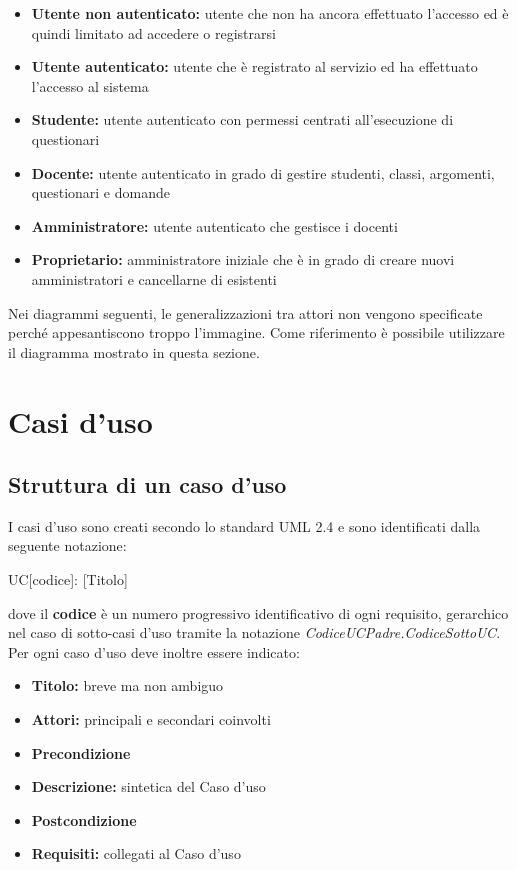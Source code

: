\documentclass[12pt,a4paper]{article}
\begin{document}
\begin{itemize}
    \item \textbf{Utente non autenticato:} utente che non ha ancora effettuato l'accesso ed è quindi limitato
        ad accedere o registrarsi
    \item \textbf{Utente autenticato:} utente che è registrato al servizio ed ha effettuato l'accesso al
        sistema
    \item \textbf{Studente:} utente autenticato con permessi centrati all'esecuzione di
        questionari
    \item \textbf{Docente:} utente autenticato in grado di gestire studenti, classi, argomenti, questionari
        e domande
    \item \textbf{Amministratore:} utente autenticato che gestisce i docenti
    \item \textbf{Proprietario:} amministratore iniziale che è in grado di creare nuovi amministratori
        e cancellarne di esistenti
\end{itemize}

Nei diagrammi seguenti, le generalizzazioni tra attori non vengono specificate perché
appesantiscono troppo l'immagine. Come riferimento è possibile utilizzare il diagramma mostrato in questa
sezione.

\newpage
\section{Casi d'uso}

\subsection{Struttura di un caso d'uso}
I casi d'uso sono creati secondo lo standard UML 2.4 e sono identificati dalla seguente notazione:
\begin{center}
	UC[codice]: [Titolo]
\end{center}
dove il \textbf{codice} è un numero progressivo identificativo di ogni requisito, gerarchico nel  caso di sotto-casi d'uso tramite la notazione \textit{CodiceUCPadre.CodiceSottoUC}. Per ogni caso d'uso deve inoltre essere indicato:
\begin{itemize}
	\item \textbf{Titolo:} breve ma non ambiguo
	\item \textbf{Attori:} principali e secondari coinvolti
	\item \textbf{Precondizione}
	\item \textbf{Descrizione:} sintetica del Caso d'uso
	\item \textbf{Postcondizione}
	\item \textbf{Requisiti:} collegati al Caso d'uso
\end{itemize}
\end{document}
